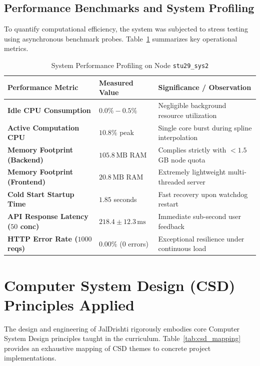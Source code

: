 \documentclass[11pt,a4paper]{article}
\begin{document}
\subsection{Performance Benchmarks and System Profiling}
To quantify computational efficiency, the system was subjected to stress testing using asynchronous benchmark probes. Table~\ref{tab:benchmarks} summarizes key operational metrics.

\begin{table}[H]
\centering
\small
\caption{System Performance Profiling on Node \texttt{stu29\_sys2}}
\label{tab:benchmarks}
\vspace{-0.2cm}
\begin{tabularx}{\linewidth}{p{4.5cm}Xp{4.5cm}}
\toprule
\textbf{Performance Metric} & \textbf{Measured Value} & \textbf{Significance / Observation} \\
\midrule
\textbf{Idle CPU Consumption} & $0.0\% - 0.5\%$ & Negligible background resource utilization \\
\textbf{Active Computation CPU} & $10.8\%$ peak & Single core burst during spline interpolation \\
\textbf{Memory Footprint (Backend)} & $105.8\,\text{MB}$ RAM & Complies strictly with $<1.5$\,GB node quota \\
\textbf{Memory Footprint (Frontend)} & $20.8\,\text{MB}$ RAM & Extremely lightweight multi-threaded server \\
\textbf{Cold Start Startup Time} & $1.85$ seconds & Fast recovery upon watchdog restart \\
\textbf{API Response Latency ($50$ conc)} & $218.4 \pm 12.3\,\text{ms}$ & Immediate sub-second user feedback \\
\textbf{HTTP Error Rate ($1000$ reqs)} & $0.00\%$ ($0$ errors) & Exceptional resilience under continuous load \\
\bottomrule
\end{tabularx}
\end{table}

\section{Computer System Design (CSD) Principles Applied}
\label{sec:csd}

The design and engineering of JalDrishti rigorously embodies core Computer System Design principles taught in the curriculum. Table~\ref{tab:csd_mapping} provides an exhaustive mapping of CSD themes to concrete project implementations.
\end{document}
